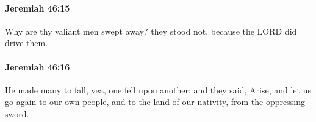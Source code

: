 		\paragraph{Jeremiah 46:15} %
			\label{JEREMIAH-46-15}

			Why are thy valiant men swept away? they stood not, because the LORD did drive them.


		\paragraph{Jeremiah 46:16} %
			\label{JEREMIAH-46-16}

			He made many to fall, yea, one fell upon another: and they said, Arise, and let us go again to our own people, and to the land of our nativity, from the oppressing sword.



